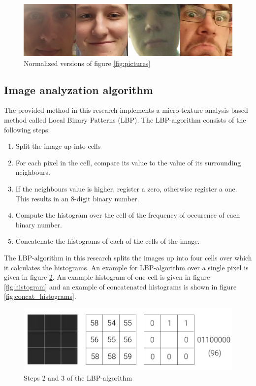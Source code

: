 \documentclass{sig-alternate-br}
\begin{document}
\begin{figure}[h]
	\includegraphics[scale=0.2]{normalized}
	\caption{Normalized versions of figure \ref{fig:pictures}}
	\label{fig:normalized}
\end{figure}


\subsection{Image analyzation algorithm} \label{lbp}
The provided method in this research implements a micro-texture analysis based method called Local Binary Patterns (LBP). The LBP-algorithm consists of the following steps:
\begin{enumerate}
	\item Split the image up into cells
	\item For each pixel in the cell, compare its value to the value of its surrounding neighbours.
	\item If the neighbours value is higher, register a zero, otherwise register a one. This results in an 8-digit binary number.
	\item Compute the histogram over the cell of the frequency of occurence of each binary number.
	\item Concatenate the histograms of each of the cells of the image.
\end{enumerate}

The LBP-algorithm in this research splits the images up into four cells over which it calculates the histograms. An example for LBP-algorithm over a single pixel is given in figure \ref{fig:lbp_pixel}. An example histogram of one cell is given in figure \ref{fig:histogram} and an example of concatenated histograms is shown in figure \ref{fig:concat_histograms}.

\begin{figure}[h]
	\includegraphics[scale=0.2]{lbp_pixel}
	\caption{Steps 2 and 3 of the LBP-algorithm}
	\label{fig:lbp_pixel}
\end{figure}
\end{document}
